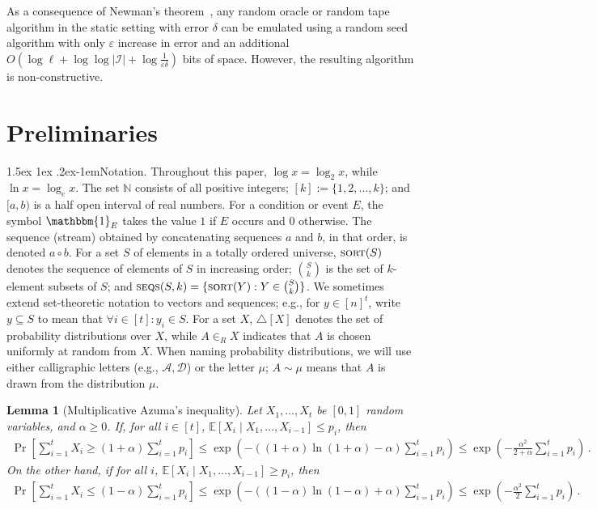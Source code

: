 \documentclass[10pt,a4paper]{article}
\makeatletter
\newtheorem{lemma}[theorem]{Lemma}
\theoremstyle{definition}
\theoremstyle{remark}
\newcommand\squeezepar{\@startsection{paragraph}{4}%
{\z@}{1.5ex \@plus1ex \@minus.2ex}{-1em}{\normalfont\normalsize\bfseries}}
\newcommand{\mypara}[1]{\squeezepar{{#1}.}}
\newcommand{\EE}{\mathbb{E}}
\newcommand{\NN}{\mathbb{N}}
\newcommand{\indic}{\mathbbm{1}}
\newcommand{\cA}{\mathcal{A}}
\newcommand{\cD}{\mathcal{D}}
\newcommand{\cI}{\mathcal{I}}
\let\epsilon\varepsilon
\newcommand{\sort}{\textsc{sort}\xspace}
\newcommand{\rl}{\mathbf{\ell}}             %
\newcommand{\concat}{\mathbin{\circ}}       %
\newcommand{\SSD}[2]{\textsc{seqs}(#1,#2)}  %
\makeatother
\begin{document}
\begin{itemize}
\begin{itemize}
As a consequence of Newman's theorem~\cite{Newman91}, any random oracle or
random tape algorithm in the static setting with error $\delta$ can be
emulated using a random seed algorithm with only $\epsilon$ increase in error
and an additional $O(\log \rl + \log \log |\cI| + \log \frac{1}{\epsilon
\delta})$ bits of space. However, the resulting algorithm is non-constructive.


\section{Preliminaries}\label{sec:prelim}

\mypara{Notation} Throughout this paper, $\log x = \log_2 x$, while $\ln x =
\log_e x$. The set $\NN$ consists of all positive integers; $[k] :=
\{1,2,\ldots,k\}$; and $[a,b)$ is a half open interval of real numbers. For a
condition or event $E$, the symbol $\indic_{E}$ takes the value $1$ if $E$
occurs and $0$ otherwise. The sequence (stream) obtained by concatenating
sequences $a$ and $b$, in that order, is denoted $a \concat b$. For a set $S$
of elements in a totally ordered universe, $\sort(S)$ denotes the sequence of
elements of $S$ in increasing order; $\binom{S}{k}$ is the set of $k$-element
subsets of $S$; and $\SSD{S}{k} = \{\sort(Y) : Y \in \binom{S}{k}\}$. We
sometimes extend set-theoretic notation to vectors and sequences; e.g., for $y
\in [n]^t$, write $y \subseteq S$ to mean that $\forall i \in [t]: y_i \in S$.
For a set $X$, $\triangle[X]$ denotes the set of probability distributions
over $X$, while $A \in_R X$ indicates that $A$ is chosen uniformly at random
from $X$. When naming probability distributions, we will use either
calligraphic letters (e.g., $\cA,\cD$) or the letter $\mu$; $A \sim \mu$ means
that $A$ is drawn from the distribution $\mu$.

\begin{lemma}[Multiplicative Azuma's inequality]\label{lem:azumanoff}
  Let $X_1,\ldots,X_t$ be $[0,1]$ random variables, and $\alpha \ge 0$. If, for all $i \in [t]$, $\EE[X_i \mid X_1,\ldots,X_{i-1}] \le p_i$, then
  \begin{align*}
    \Pr\left[ \sum_{i=1}^{t} X_i \ge (1 + \alpha) \sum_{i =1}^{t} p_i \right] 
    \le \exp\left( - ((1+\alpha) \ln (1+\alpha) - \alpha) \sum_{i =1}^{t} p_i\right) 
    \le \exp\left( - \frac{\alpha^2}{2 + \alpha} \sum_{i =1}^{t} p_i\right) \,.
  \end{align*}
  On the other hand, if for all $i$, $\EE[X_i \mid X_1,\ldots,X_{i-1}] \ge p_i$, then
  \begin{align*}
    \Pr\left[ \sum_{i=1}^{t} X_i \le (1 - \alpha) \sum_{i =1}^{t} p_i \right]
    \le \exp\left( - ((1-\alpha) \ln (1-\alpha) + \alpha) \sum_{i =1}^{t} p_i\right) 
    \le \exp\left( - \frac{\alpha^2}{2} \sum_{i =1}^{t} p_i\right) \,.
  \end{align*}
\end{lemma}


\end{itemize}
\end{itemize}
\end{document}
